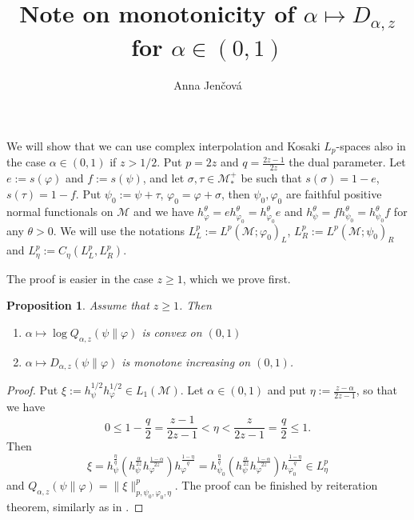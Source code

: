 \documentclass[12pt]{article}
\title{Note on monotonicity of  $\alpha\mapsto D_{\alpha,z}$ for $\alpha\in (0,1)$}
\author{Anna Jen\v cov\'a}
\newtheorem{prop}{Proposition}
\theoremstyle{definition}
\theoremstyle{remark}
\def\Me{\mathcal M}
\begin{document}
\maketitle

We will show that we can use complex interpolation and Kosaki $L_p$-spaces  also in the case $\alpha\in (0,1)$ if
$z>1/2$. Put $p=2z$ and $q=\frac{2z-1}{2z}$ the dual parameter. 
Let $e:=s(\varphi)$ and $f:=s(\psi)$, and let $\sigma,\tau\in \Me_*^+$ be such that
$s(\sigma)=1-e$, $s(\tau)=1-f$. Put $\psi_0:=\psi+\tau$, $\varphi_0=\varphi+\sigma$, then
$\psi_0,\varphi_0$ are faithful positive normal functionals on $\Me$ and we have
$h_{\varphi}^\theta=eh_{\varphi_0}^\theta=h_{\varphi_0}^\theta e$ and
$h_{\psi}^\theta=fh_{\psi_0}^\theta=h_{\psi_0}^\theta f$ for any $\theta>0$. 
We will use the notations $L^p_L:=L^p(\Me;\varphi_0)_L$, $L^p_R:=L^p(\Me;\psi_0)_R$ and 
$L^p_\eta:=C_\eta(L^p_L,L^p_R)$.

The proof is easier in the case $z\ge 1$, which we prove first.

\begin{prop}\label{prop:incr}
Assume that $z\ge 1$.  Then 
\begin{enumerate}
\item $\alpha\mapsto \log
Q_{\alpha,z}(\psi\|\varphi)$ is convex on $(0,1)$
\item $\alpha\mapsto D_{\alpha,z}(\psi\|\varphi)$ is monotone increasing on $(0,1)$.
\end{enumerate}

\end{prop}



\begin{proof}  Put $\xi:=h_\psi^{1/2}h_\varphi^{1/2}\in L_1(\Me)$. Let $\alpha\in (0,1)$ and put
$\eta:=\tfrac{z-\alpha}{2z-1}$, so that we have 
\[
0\le 1-\frac q2=\frac{z-1}{2z-1}<\eta< \frac{z}{2z-1}=\frac q2\le 1.
\]
Then 
\[
\xi=h_\psi^{\frac{\eta}q}(h_\psi^{\frac{\alpha}{2z}}h_\varphi^{\frac{1-\alpha}{2z}})h_\varphi^{\frac{1-\eta}q}=
h_{\psi_0}^{\frac{\eta}q}(h_\psi^{\frac{\alpha}{2z}}h_\varphi^{\frac{1-\alpha}{2z}})h_{\varphi_0}^{\frac{1-\eta}q}\in
L^p_\eta
\]
and $Q_{\alpha,z}(\psi\|\varphi)=\|\xi\|^p_{p,\psi_0,\varphi_0,\eta}$. The proof can be
finished by reiteration theorem,  similarly as in \cite[Prop. 0.1]{FHnote6}. 




\end{proof}
\end{document}
